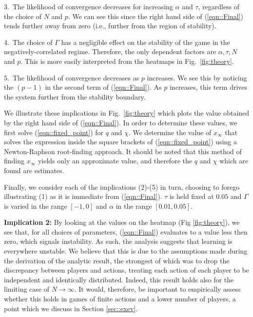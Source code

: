 \documentclass{article}
\newcommand{\xfixed}{x_\infty}
\begin{document}
   3.~The likelihood of convergence decreases for increasing $\alpha$ and $\tau$, regardless of the choice of $N$ and $p$. We can see this since the right hand side of (\ref{eqn::Final}) tends further away from zero (i.e., further from the region of stability).
    
    4.~The choice of $\Gamma$ has a negligible effect on the stability of the game in the negatively-correlated regime. Therefore, the only dependent factors are $\alpha, \tau, N$ and $p$. This is more easily interpreted from the heatmaps in Fig.~\ref{fig:theory}.
    
    5.~The likelihood of convergence decreases as $p$ increases. We see this by noticing the $(p-1)$ in the second term of (\ref{eqn::Final}). As $p$ increases, this term drives the system further from the stability boundary.


We illustrate these implications in Fig.~\ref{fig:theory} which plots the value obtained by the right hand side of (\ref{eqn::Final}). In order to determine these values, we first solve (\ref{eqn::fixed_point}) for $q$ and $\chi$. We determine the value of $\xfixed$ that solves the expression inside the square brackets of (\ref{eqn::fixed_point}) using a Newton-Raphson root-finding approach. It should be noted that this method of finding $\xfixed$ yields only an approximate value, and therefore the $q$ and $\chi$ which are found are estimates. 

Finally, we consider each of the implications (2)-(5) 
in turn, choosing to forego illustrating (1) as it is immediate
from (\ref{eqn::Final}). $\tau$ is held fixed
at $0.05$ and  $\Gamma$ is varied in
the range $[-1, 0]$ and $\alpha$ in the range $[0.01, 0.05]$.

\textbf{Implication 2:} By looking at the values on the heatmap (Fig \ref{fig:theory}), we see that, for all choices
of parameters,
(\ref{eqn::Final}) evaluates to a value less then zero, which signals
instability. As such, the analysis suggests that learning is everywhere unstable. We believe that this is due to the
assumptions made during the derivation of the analytic result, the
strongest of which was to drop the discrepancy between players and
actions, treating each action of each player to be independent and
identically distributed. Indeed, this result holds also for the limiting case of $N \rightarrow \infty$. It would, therefore, be important to empirically assess whether this holds in games of finite actions and a lower number of players, a point which we discuss in Section \ref{sec::exev}.
\end{document}
